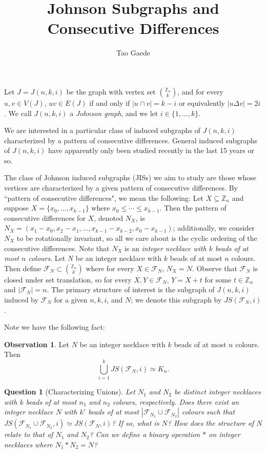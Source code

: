 \documentclass[12]{article}
\title{ \vspace{-3cm} Johnson Subgraphs and Consecutive Differences}
\author{Tao Gaede}
\newcommand{\Z}{\mathbb{Z}}
\newtheorem{question}{Question}
\theoremstyle{definition}
\newtheorem{obs}{Observation}
\begin{document}
	\maketitle

	Let $J = J(n,k,i)$ be the graph with vertex set ${\Z_n \choose k}$, and for every $u,v \in V(J)$, $uv \in E(J)$ if and only if $|u \cap v| = k-i$ or equivalently $|u \Delta v| = 2i$.  We call $J(n,k,i)$ a \emph{Johnson graph}, and we let $i \in \{1,\ldots,k\}$.
	
	We are interested in a particular class of induced subgraphs of $J(n,k,i)$ characterized by a pattern of consecutive differences.  General induced subgraphs of $J(n,k,i)$ have apparently only been studied recently in the last 15 years or so.
	
	The class of Johnson induced subgraphs (JISs) we aim to study are those whose vertices are characterized by a given pattern of consecutive differences.  By ``pattern of consecutive differences", we mean the following: Let $X \subseteq \Z_n$ and suppose $X = \{x_0,\ldots,x_{k-1}\}$ where $x_0 \leq \cdots \leq x_{k-1}$.  Then the pattern of consecutive differences for $X$, denoted $N_X$, is $N_X = (x_1-x_0,x_2-x_1,\ldots,x_{k-1} - x_{k-2}, x_0 - x_{k-1})$; additionally, we consider $N_X$ to be rotationally invariant, so all we care about is the cyclic ordering of the consecutive differences.  Note that $N_X$ is an \emph{integer necklace with $k$ beads of at most $n$ colours}.    Let $N$ be an integer necklace with $k$ beads of at most $n$ colours.  Then define $\mathcal{F}_N \subset {\Z_n \choose k}$ where for every $X \in \mathcal{F}_N$, $N_X = N$.  Observe that $\mathcal{F}_N$ is closed under set translation, so for every $X,Y \in \mathcal{F}_N$, $Y = X + t$ for some $t \in \Z_n$ and $|\mathcal{F}_N| = n$.  The primary structure of interest is the subgraph of $J(n,k,i)$ induced by $\mathcal{F}_N$ for a given $n,k,i$, and $N$; we denote this subgraph by $JS(\mathcal{F}_N,i)$.
	
	Note we have the following fact:
	\begin{obs}
		Let $N$ be an integer necklace with $k$ beads of at most $n$ colours.  Then
		$$\bigcup_{i=1}^{k} JS(\mathcal{F}_N,i) \simeq K_n.$$
	\end{obs}
	
	\begin{question}[Characterizing Unions]
		Let $N_1$ and $N_2$ be distinct integer necklaces with $k$ beads of at most $n_1$ and $n_2$ colours, respectively.  Does there exist an integer necklace $N$ with $k'$ beads of at most $|\mathcal{F}_{N_1} \cup \mathcal{F}_{N_2}|$ colours such that $JS(\mathcal{F}_{N_1} \cup \mathcal{F}_{N_2},i) \simeq JS(\mathcal{F}_N,i)$?  If so, what is $N$?  How does the structure of $N$ relate to that of $N_1$ and $N_2$?  Can we define a binary operation $*$ on integer necklaces where $N_1 * N_2 = N$?
	\end{question}
	
\end{document}
